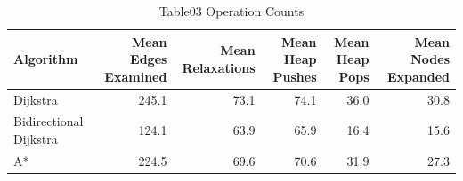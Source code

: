\begin{table}[htbp]
\centering
\caption{Table03 Operation Counts}
\begin{tabular}{lrrrrr}
\hline
Algorithm & Mean Edges Examined & Mean Relaxations & Mean Heap Pushes & Mean Heap Pops & Mean Nodes Expanded \\
\hline
Dijkstra & 245.1 & 73.1 & 74.1 & 36.0 & 30.8 \\
Bidirectional Dijkstra & 124.1 & 63.9 & 65.9 & 16.4 & 15.6 \\
A* & 224.5 & 69.6 & 70.6 & 31.9 & 27.3 \\
\hline
\end{tabular}
\end{table}
